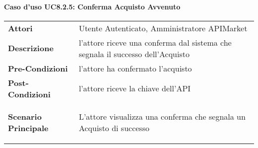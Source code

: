 \paragraph{Caso d'uso UC8.2.5: Conferma Acquisto Avvenuto}
\label{UC8.2.5}

\renewcommand*{\arraystretch}{1.6}
\begin{longtable}{ l | p{11cm}}
	\hline
	\rowcolor{Gray}
	\multicolumn{2}{c}{UC8.2.5: Conferma Acquisto Avvenuto} \\
	\hline
	\textbf{Attori} &Utente Autenticato, Amministratore APIMarket \\
	\textbf{Descrizione} & l'attore riceve una conferma dal sistema che segnala il successo dell'Acquisto  \\
	\textbf{Pre-Condizioni} &  l'attore ha confermato l'acquisto\\
	\textbf{Post-Condizioni}& l'attore riceve la chiave dell'API\\
	\textbf{Scenario Principale} & \begin{enumerate*}[label=(\arabic*.),itemjoin={\newline}]
		\item L'attore visualizza una conferma che segnala un Acquisto di successo
	\end{enumerate*}\\
\end{longtable}
